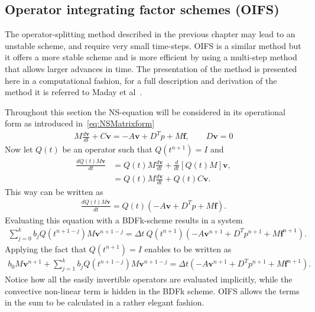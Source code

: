 \subsection{Operator integrating factor schemes (OIFS)}\label{OIFS}
The operator-splitting method described in the previous chapter may lead to an unstable scheme, 
and require very small time-steps.
OIFS is a similar method but it offers a more stable scheme and is more efficient by using a multi-step method that allows 
larger advances in time. The presentation of the method is presented here in a computational fashion,
for a full description and derivation of the method it is referred to Maday et al~\cite{raey}.

Throughout this section the NS-equation will be considered in its operational form as introduced in~\ref{eq:NSMatrixform}
%
\begin{align}
    M\frac{d \mathbf{v}}{dt} + C\mathbf{v} = -A\mathbf{v} +D^T p +M\mathbf{f}, \qquad D\mathbf{v} = 0
    \label{eq:NSoperator}
\end{align}
%
Now let $Q(t)$ be an operator such that $Q(t^{n+1}) = I$ and 
%
\begin{align}
    \frac{dQ(t)M\mathbf{v}}{dt} &=  Q(t)M\frac{d\mathbf{v}}{dt} + \frac{d}{dt}\left[  Q(t)M\right]\mathbf{v},\\
    &= Q(t)M\frac{d\mathbf{v}}{dt} + Q(t)C\mathbf{v}. 
    \label{eq:integrationalfactor}
\end{align}
%
This way  can be written as 
\begin{align}
    \frac{d Q(t)M\mathbf{v}}{dt} =Q(t)( -A\mathbf{v} +D^T p +M\mathbf{f}).
    \label{eq:NSoperatorOIFS}
\end{align}
Evaluating this equation with a BDFk-scheme results in a system 
\begin{align}
    \sum_{j=0}^{k}b_jQ(t^{n+1-j})M\mathbf{v}^{n+1-j} =\Delta t \: Q(t^{n+1})( -A\mathbf{v}^{n+1} +D^T p^{n+1} +M\mathbf{f}^{n+1}).
    \label{eq:NSOIFS1}
\end{align}
Applying the fact that $Q(t^{n+1}) = I$ enables  to be written as 
\begin{align}
    b_0M\mathbf{v}^{n+1} + \sum_{j=1}^{k}b_jQ(t^{n+1-j})M\mathbf{v}^{n+1-j} 
    =\Delta t ( -A\mathbf{v}^{n+1} +D^T p^{n+1} +M\mathbf{f}^{n+1}).
    \label{eq:NSOIFS1}
\end{align}
Notice how all the easily invertible operators are evaluated implicitly, while the convective non-linear term is hidden in the BDFk scheme. 
OIFS allows the terms in the sum to be calculated in a rather elegant fashion.
